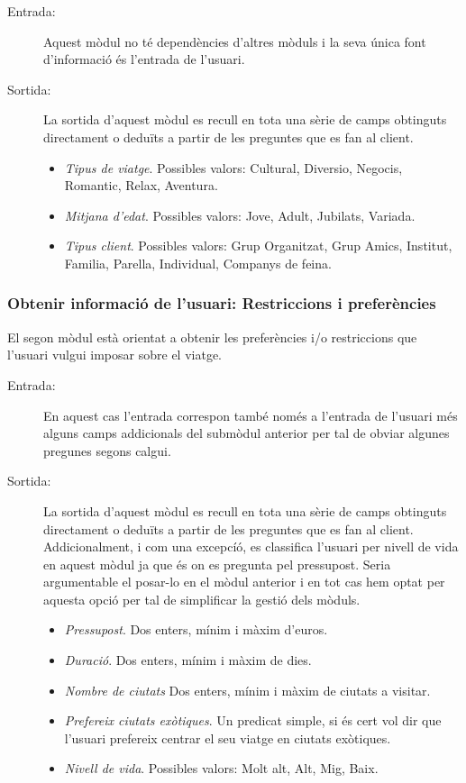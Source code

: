 \documentclass[11pt,a4paper]{article}
\begin{document}
\begin{description}
	\item[Entrada:] Aquest mòdul no té dependències d'altres mòduls i la seva única font d'informació és l'entrada de l'usuari. 

	\item[Sortida:] La sortida d'aquest mòdul es recull en tota una sèrie de camps obtinguts directament o deduïts a partir de les preguntes que es fan al client.
	\begin{itemize}
	\item \emph{Tipus de viatge}. Possibles valors: Cultural, Diversio, Negocis, Romantic, Relax, Aventura.
	\item \emph{Mitjana d'edat}. Possibles valors: Jove, Adult, Jubilats, Variada.
	\item \emph{Tipus client}. Possibles valors: Grup Organitzat, Grup Amics, Institut, Familia, Parella, Individual, Companys de feina.
	\end{itemize}

\end{description}

\subsubsection[Informació de l'usuari: Preferències]{Obtenir informació de l'usuari: Restriccions i preferències}

El segon mòdul està orientat a obtenir les preferències i/o restriccions que l'usuari vulgui imposar sobre el viatge.

\begin{description}
	\item[Entrada:] En aquest cas l'entrada correspon també només a l'entrada de l'usuari més alguns camps addicionals del submòdul anterior per tal de obviar algunes pregunes segons calgui.

	\item[Sortida:] La sortida d'aquest mòdul es recull en tota una sèrie de camps obtinguts directament o deduïts a partir de les preguntes que es fan al client. Addicionalment, i com una excepcíó, es classifica l'usuari per nivell de vida en aquest mòdul ja que és on es pregunta pel pressupost. Seria argumentable el posar-lo en el mòdul anterior i en tot cas hem optat per aquesta opció per tal de simplificar la gestió dels mòduls.
	\begin{itemize}
	\item \emph{Pressupost}. Dos enters, mínim i màxim d'euros.
	\item \emph{Duració}. Dos enters, mínim i màxim de dies.
	\item \emph{Nombre de ciutats} Dos enters, mínim i màxim de ciutats a visitar.
	\item \emph{Prefereix ciutats exòtiques}. Un predicat simple, si és cert vol dir que l'usuari prefereix centrar el seu viatge en ciutats exòtiques.
	\item \emph{Nivell de vida}. Possibles valors: Molt alt, Alt, Mig, Baix.
	\end{itemize}

\end{description}
\end{document}
